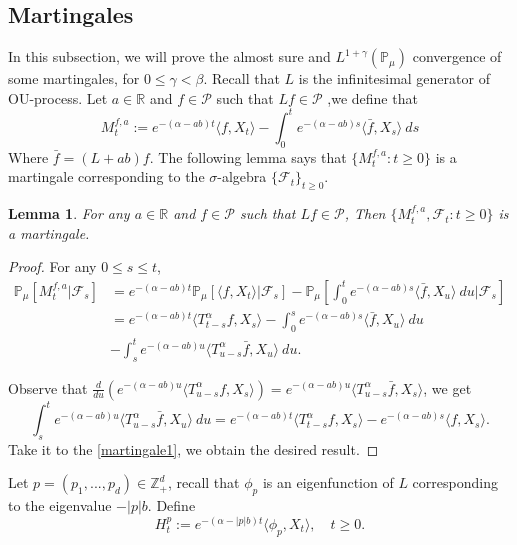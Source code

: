 \documentclass{article}
\newtheorem{lemma}{Lemma}[section]
\begin{document}
\subsection{Martingales}

In this subsection, we will prove the almost sure and $L^{1+\gamma}(\mathbb{P}_{\mu})$ convergence of some martingales, for $0\leq\gamma<\beta$. Recall that $L$ is the infinitesimal generator of OU-process. Let $a\in \mathbb{R}$ and $f\in \mathcal{P}$ such that $Lf \in \mathcal{P}$ ,we define that
$$M_t^{f,a}:=e^{-(\alpha-ab)t}\langle f,X_t\rangle-\int_0^t e^{-(\alpha-ab)s}\langle \bar{f}, X_s\rangle~ ds$$
Where $\bar{f}=(L+ab)f$. The following lemma says that $\{M_t^{f,a}: t\geq 0\}$ is a martingale corresponding to the $\sigma$-algebra $\{\mathcal{F}_t\}_{t\geq 0}$.
\begin{lemma}\label{lemma25}
For any $a \in \mathbb{R}$ and $f\in\mathcal{P}$ such that $L f\in\mathcal{P}$, Then $\{M_t^{f,a},\mathcal{F}_t:t\geq 0\}$ is a martingale.
\end{lemma}

\begin{proof} 
For any $0\leq s\leq t$,
\begin{align}
    \mathbb{P}_{\mu}\left[M_t^{f,a}|\mathcal{F}_s\right] &=e^{-(\alpha-ab)t}\mathbb{P}_{\mu}\left[\langle f,X_t\rangle|\mathcal{F}_s\right]-\mathbb{P}_{\mu}\left[\int_0^t e^{-(\alpha-ab)s}\langle \bar{f}, X_u\rangle~ du|\mathcal{F}_s\right]\nonumber\\
    &=e^{-(\alpha-ab)t}\langle T_{t-s}^{\alpha}f, X_s\rangle-\int_0^s e^{-(\alpha-ab)s}\langle \bar{f}, X_u\rangle~ du\nonumber\\
    &-\int_s^t e^{-(\alpha-ab)u}\langle T_{u-s}^{\alpha} \bar{f},X_u\rangle~ du.\label{martingale1}
\end{align}

Observe that $\frac{d}{du}\left(e^{-(\alpha-ab)u}\langle T_{u-s}^{\alpha}f,X_s\rangle\right)=e^{-(\alpha-ab)u}\langle T_{u-s}^{\alpha}\bar{f},X_s\rangle$, we get
$$\int_s^t e^{-(\alpha-ab)u}\langle T_{u-s}^{\alpha} \bar{f},X_u\rangle~ du=e^{-(\alpha-ab)t}\langle T_{t-s}^{\alpha}f,X_s\rangle-e^{-(\alpha-ab)s}\langle f,X_s\rangle.$$
Take it to the \eqref{martingale1}, we obtain the desired result.
\end{proof}

Let $p=(p_1,...,p_d)\in \mathbb{Z}_+^d$, recall that $\phi_p$ is an eigenfunction of $L$ corresponding to the eigenvalue $-|p|b$. Define
$$H_t^p:=e^{-(\alpha-|p|b)t}\langle\phi_p,X_t\rangle, \quad t\geq 0.$$
\end{document}
